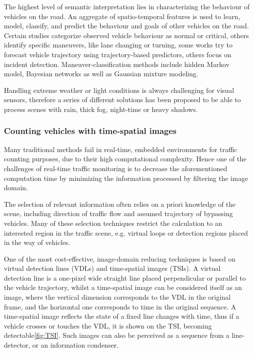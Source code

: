 The highest level of semantic interpretation lies in characterizing the behaviour of vehicles on the road\cite{Sivaraman2013}.
An aggregate of spatio-temporal features is used to learn, model, classify, and predict the behaviour and goals of other vehicles on the road.
Certain studies categorize observed vehicle behaviour as normal or critical\cite{Cherng2009}, others identify specific maneuvers, like lane changing or turning\cite{Garcia2012}, some works try to forecast vehicle trajectory using trajectory-based predictors\cite{Hermes2009}, others focus on incident detection\cite{Kamijo2004}.
Maneuver-classification methods include hidden Markov model\cite{Sivaraman2011}, Bayesian networks\cite{Kasper2012} as well as Gaussian mixture modeling\cite{Wiest2012}.

Handling extreme weather or light conditions is always challenging for visual sensors, therefore a series of different solutions has been proposed to be able to process scenes with rain\cite{Yu2015,Barnum2010}, thick fog\cite{Zhou2014a,Tarel2009}, night-time\cite{Bi2009, Robert2009} or heavy shadows\cite{Kamkar2016, Miller2015}.

\subsubsection{Counting vehicles with time-spatial images}
Many traditional methods fail in real-time, embedded environments for traffic counting purposes, due to their high computational complexity.
Hence one of the challenges of real-time traffic monitoring is to decrease the aforementioned computation time by minimizing the information processed by filtering the image domain.

The selection of relevant information often relies on a priori knowledge of the scene, including direction of traffic flow and assumed trajectory of bypassing vehicles.
Many of these selection techniques restrict the calculation to an interested region in the traffic scene, e.g. virtual loops\cite{Tursun2013a, He2008} or detection regions\cite{Miller2015s, Engel2016} placed in the way of vehicles.

One of the most cost-effective, image-domain reducing techniques is based on virtual detection lines (VDLs) and time-spatial images (TSIs).
A virtual detection line is a one-pixel wide straight line placed perpendicular or parallel to the vehicle trajectory, whilst a time-spatial image can be considered itself as an image, where the vertical dimension corresponds to the VDL in the original frame, and the horizontal one corresponds to time in the original sequence.
A time-spatial image reflects the state of a fixed line changes with time, thus if a vehicle crosses or touches the VDL, it is shown on the TSI, becoming detectable\ref{fig:TSI}.
Such images can also be perceived as a sequence from a line-detector, or an information condenser. 

